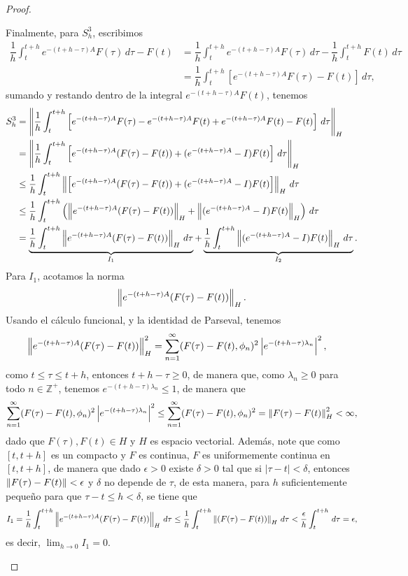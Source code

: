 \begin{proof}
\begin{enumerate}
    Finalmente, para $S_h^3$, escribimos
    \begin{align*}
        \dfrac{1}{h}\int_{t}^{t+h}e^{-(t+h-\tau)A}F(\tau)\, d\tau-F(t)&=\dfrac{1}{h}\int_{t}^{t+h}e^{-(t+h-\tau)A}F(\tau)\, d\tau-\dfrac{1}{h}\int_{t}^{t+h} F(t)\, d\tau\\
        &=\dfrac{1}{h}\int_{t}^{t+h}[e^{-(t+h-\tau)A}F(\tau)-F(t)]\, d\tau,
    \end{align*}
    sumando y restando dentro de la integral $e^{-(t+h-\tau)A}F(t)$, tenemos
    \begin{align*}
        S_h^3&=\left\|\dfrac{1}{h}\int_t^{t+h}\left[e^{-(t+h-\tau)A}F(\tau)-e^{-(t+h-\tau)A}F(t)+e^{-(t+h-\tau)A}F(t)-F(t)\right]\, d\tau\right\|_H\\
        &=\left\|\dfrac{1}{h}\int_t^{t+h}\left[e^{-(t+h-\tau)A}(F(\tau)-F(t))+(e^{-(t+h-\tau)A}-I)F(t)\right]\, d\tau\right\|_H\\
        &\leq \dfrac{1}{h}\int_{t}^{t+h}\left\|\left[e^{-(t+h-\tau)A}(F(\tau)-F(t))+(e^{-(t+h-\tau)A}-I)F(t)\right]\right\|_H\, d\tau\\
        &\leq \dfrac{1}{h}\int_{t}^{t+h}\left(\left\|e^{-(t+h-\tau)A}(F(\tau)-F(t))\right\|_H+\left\|(e^{-(t+h-\tau)A}-I)F(t)\right\|_H\right)\, d\tau\\
        &=\underbrace{\dfrac{1}{h}\int_{t}^{t+h}\left\|e^{-(t+h-\tau)A}(F(\tau)-F(t))\right\|_H\, d\tau}_{I_1}+\underbrace{\dfrac{1}{h}\int_{t}^{t+h}\left\|(e^{-(t+h-\tau)A}-I)F(t)\right\|_H\, d\tau}_{I_2}.
    \end{align*}
    Para $I_1$, acotamos la norma 
    \begin{align*}
        \left\|e^{-(t+h-\tau)A}(F(\tau)-F(t))\right\|_H.
    \end{align*}
    Usando el cálculo funcional, y la identidad de Parseval, tenemos
    \begin{align*}
        \left\|e^{-(t+h-\tau)A}(F(\tau)-F(t))\right\|_H^2&=\sum_{n=1}^\infty (F(\tau)-F(t),\phi_n)^2\left|e^{-(t+h-\tau)\lambda_n}\right|^2,
    \end{align*}
    como $t\leq \tau\leq t+h$, entonces $t+h-\tau\geq 0$, de manera que, como $\lambda_n\geq 0$ para todo $n \in \mathbb{Z}^+$, tenemos $e^{-(t+h-\tau)\lambda_n}\leq 1$, de manera que
    \begin{align*}
        \sum_{n=1}^\infty (F(\tau)-F(t),\phi_n)^2\left|e^{-(t+h-\tau)\lambda_n}\right|^2\leq \sum_{n=1}^\infty (F(\tau)-F(t),\phi_n)^2=\left\|F(\tau)-F(t)\right\|_H^2<\infty,
    \end{align*}
    dado que $F(\tau),F(t)\in H$ y $H$ es espacio vectorial. Además, note que como $[t,t+h]$ es un compacto y $F$ es continua, $F$ es uniformemente continua en $[t,t+h]$, de manera que dado $\epsilon>0$ existe $\delta>0$ tal que si $|\tau-t|<\delta$, entonces $\left\|F(\tau)-F(t)\right\|<\epsilon$ y $\delta$ no depende de $\tau$, de esta manera, para $h$ suficientemente pequeño para que $\tau-t\leq h<\delta$, se tiene que
    \begin{align*}
        I_1=\dfrac{1}{h}\int_{t}^{t+h}\left\|e^{-(t+h-\tau)A}(F(\tau)-F(t))\right\|_H\, d\tau\leq \dfrac{1}{h}\int_{t}^{t+h}\left\|(F(\tau)-F(t))\right\|_H\, d\tau<\dfrac{\epsilon}{h}\int_{t}^{t+h}\, d\tau=\epsilon,
    \end{align*}
    es decir, $\displaystyle \lim_{h\to 0}I_1=0$.


\end{enumerate}
\end{proof}
